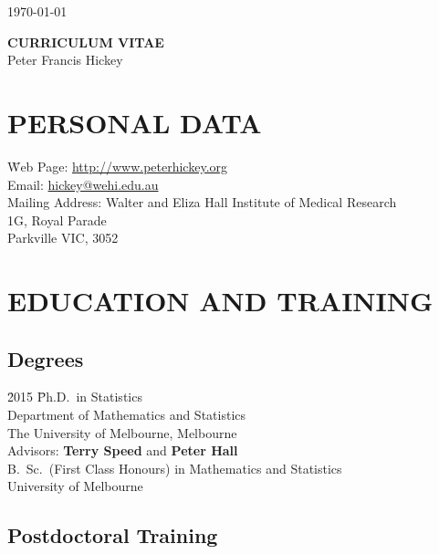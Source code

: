 \documentclass[11pt,letterpaper,pdf]{article}
\begin{document}
\hfill \today

\begin{center}
{\bf \Large CURRICULUM VITAE}\\
\vspace*{5mm}
{\Large Peter Francis Hickey}
\end{center}


\section*{PERSONAL DATA}

\begin{tabbing}
  \= Web Page:\hspace*{2cm}
  \=\href{http://www.peterhickey.org}{http://www.peterhickey.org} \\
  \> Email: \>\href{mailto:hickey@wehi.edu.au}{hickey@wehi.edu.au} \\
  \> Mailing Address: \>Walter and Eliza Hall Institute of Medical Research\\
  \> \>1G, Royal Parade\\
  \> \>Parkville VIC, 3052\\
\end{tabbing}


\section*{EDUCATION AND TRAINING}

\subsection*{Degrees}

\begin{tabbing}
  \=2015 \hspace*{1.5cm} \=Ph.D.\ in Statistics\\
  \>\>Department of Mathematics and Statistics\\
  \>\>The University of Melbourne, Melbourne \\
  \>\>Advisors: \textbf{Terry Speed} and \textbf{Peter Hall}\\
    \>B.\ Sc.\ (First Class Honours) in Mathematics and Statistics \\
    \>\>University of Melbourne
\end{tabbing}

\subsection*{Postdoctoral Training}
\end{document}
